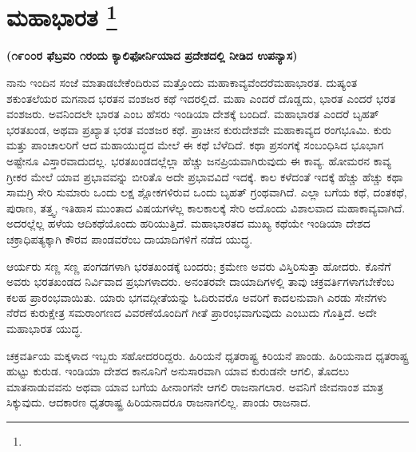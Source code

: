 
\chapter[ಮಹಾಭಾರತ ]{ಮಹಾಭಾರತ \protect\footnote{}}

\centerline{\textbf{(೧೯೦೦ರ ಫೆಬ್ರವರಿ ೧ರಂದು ಕ್ಯಾಲಿಫೋರ್ನಿಯಾದ ಪ್ರದೇಶದಲ್ಲಿ ನೀಡಿದ ಉಪನ್ಯಾಸ)}}

\vskip 0.3cm

ನಾನು ಇಂದಿನ ಸಂಜೆ ಮಾತಾಡಬೇಕೆಂದಿರುವ ಮತ್ತೊಂದು ಮಹಾಕಾವ್ಯವೆಂದರೆ\break ಮಹಾಭಾರತ. ದುಷ್ಯಂತ ಶಕುಂತಲೆಯರ ಮಗನಾದ ಭರತನ ವಂಶಜರ ಕಥೆ ಇದರಲ್ಲಿದೆ. ಮಹಾ ಎಂದರೆ ದೊಡ್ಡದು, ಭಾರತ ಎಂದರೆ ಭರತ ವಂಶಜರು. ಅವನಿಂದಲೇ ಭಾರತ ಎಂಬ ಹೆಸರು ಇಂಡಿಯಾ ದೇಶಕ್ಕೆ ಬಂದಿದೆ. ಮಹಾಭಾರತ ಎಂದರೆ ಬೃಹತ್​ ಭರತಖಂಡ, ಅಥವಾ ಪ್ರಖ್ಯಾತ ಭರತ ವಂಶಜರ ಕಥೆ. ಪ್ರಾಚೀನ ಕುರುದೇಶವೇ ಮಹಾಕಾವ್ಯದ ರಂಗಭೂಮಿ. ಕುರು ಮತ್ತು ಪಾಂಚಾಲರಿಗೆ ಆದ ಮಹಾಯುದ್ಧದ ಮೇಲೆ ಈ ಕಥೆ ಬೆಳೆದಿದೆ. ಕಥಾ ಪ್ರಸಂಗಕ್ಕೆ ಸಂಬಂಧಿಸಿದ ಭೂಭಾಗ ಅಷ್ಟೇನೂ ವಿಸ್ತಾರವಾದುದಲ್ಲ. ಭರತಖಂಡದಲ್ಲೆಲ್ಲಾ ಹೆಚ್ಚು ಜನಪ್ರಿಯವಾಗಿರುವುದು ಈ ಕಾವ್ಯ. ಹೋಮರನ ಕಾವ್ಯ ಗ್ರೀಕರ ಮೇಲೆ ಯಾವ ಪ್ರಭಾವವನ್ನು ಬೀರಿತೊ ಅದೇ ಪ್ರಭಾವವಿದೆ ಇದಕ್ಕೆ. ಕಾಲ ಕಳೆದಂತೆ ಇದಕ್ಕೆ ಹೆಚ್ಚು ಹೆಚ್ಚು ಕಥಾ ಸಾಮಗ್ರಿ ಸೇರಿ ಸುಮಾರು ಒಂದು ಲಕ್ಷ ಶ್ಲೋಕಗಳಿರುವ ಒಂದು ಬೃಹತ್​ ಗ್ರಂಥವಾಗಿದೆ. ಎಲ್ಲಾ ಬಗೆಯ ಕಥೆ, ದಂತಕಥೆ, ಪುರಾಣ, ತತ್ತ್ವ, ಇತಿಹಾಸ ಮುಂತಾದ ವಿಷಯಗಳೆಲ್ಲ ಕಾಲಕಾಲಕ್ಕೆ ಸೇರಿ ಅದೊಂದು ವಿಶಾಲವಾದ ಮಹಾಕಾವ್ಯವಾಗಿದೆ. ಅದರಲ್ಲೆಲ್ಲ ಹಳೆಯ ಆದಿಕಥೆಯೊಂದು ಹರಿಯುತ್ತಿದೆ. ಮಹಾಭಾರತದ ಮುಖ್ಯ ಕಥೆಯೇ ಇಂಡಿಯಾ ದೇಶದ ಚಕ್ರಾಧಿಪತ್ಯಕ್ಕಾಗಿ ಕೌರವ ಪಾಂಡವರೆಂಬ ದಾಯಾದಿಗಳಿಗೆ ನಡೆದ ಯುದ್ಧ.

\vskip 0.1cm

ಆರ್ಯರು ಸಣ್ಣ ಸಣ್ಣ ಪಂಗಡಗಳಾಗಿ ಭರತಖಂಡಕ್ಕೆ ಬಂದರು; ಕ್ರಮೇಣ ಅವರು ವಿಸ್ತಿರಿಸುತ್ತಾ ಹೋದರು. ಕೊನೆಗೆ ಅವರು ಭರತಖಂಡದ ನಿರ್ವಿವಾದ ಪ್ರಭುಗಳಾದರು. ಅನಂತರವೇ ದಾಯಾದಿಗಳಲ್ಲಿ ತಾವು ಚಕ್ರವರ್ತಿಗಳಾಗಬೇಕೆಂಬ ಕಲಹ ಪ್ರಾರಂಭವಾಯಿತು. ಯಾರು ಭಗವದ್ಗೀತೆಯನ್ನು ಓದಿರುವರೊ ಅವರಿಗೆ ಕಾದಲನುವಾಗಿ ಎರಡು ಸೇನೆಗಳು ನೆರೆದ ಕುರುಕ್ಷೇತ್ರ ಸಮರಾಂಗಣದ ವಿವರಣೆಯೊಂದಿಗೆ ಗೀತೆ ಪ್ರಾರಂಭವಾಗುವುದು ಎಂಬುದು ಗೊತ್ತಿದೆ. ಅದೇ ಮಹಾಭಾರತ ಯುದ್ಧ.

\vskip 0.1cm

ಚಕ್ರವರ್ತಿಯ ಮಕ್ಕಳಾದ ಇಬ್ಬರು ಸಹೋದರರಿದ್ದರು. ಹಿರಿಯನೆ ಧೃತರಾಷ್ಟ್ರ ಕಿರಿಯನೆ ಪಾಂಡು. ಹಿರಿಯನಾದ ಧೃತರಾಷ್ಟ್ರ ಹುಟ್ಟು ಕುರುಡ. ಇಂಡಿಯಾ ದೇಶದ ಕಾನೂನಿಗೆ ಅನುಸಾರವಾಗಿ ಯಾವ ಕುರುಡನೇ ಆಗಲಿ, ತೊದಲು ಮಾತನಾಡುವವನು ಅಥವಾ ಯಾವ ಬಗೆಯ ಹೀನಾಂಗನೇ ಆಗಲಿ ರಾಜನಾಗಲಾರ. ಅವನಿಗೆ ಜೀವನಾಂಶ ಮಾತ್ರ ಸಿಕ್ಕುವುದು. ಆದಕಾರಣ ಧೃತರಾಷ್ಟ್ರ ಹಿರಿಯನಾದರೂ ರಾಜನಾಗಲಿಲ್ಲ. ಪಾಂಡು ರಾಜನಾದ.

\vskip 0.1cm

